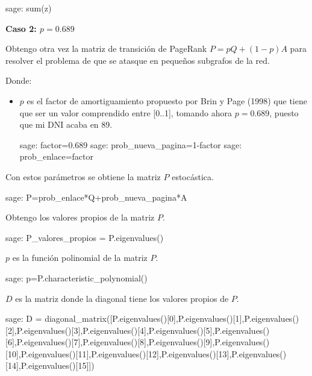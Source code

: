 \begin{sagecommandline}
    sage: sum(z)
\end{sagecommandline}


\par\textbf{Caso 2: $p = 0.689$}
\par Obtengo otra vez la matriz de transición de PageRank $P=pQ + (1-p)A$ para resolver el 
problema de que se atasque en pequeños subgrafos de la red.
\par Donde:
\begin{itemize}
    \item $p$ es el factor de amortiguamiento propuesto por Brin y Page (1998) que tiene que ser un valor 
    comprendido entre [0..1], tomando ahora $p = 0.689$, puesto que mi DNI acaba en 89.
    \begin{sagecommandline}
        sage: factor=0.689
        sage: prob_nueva_pagina=1-factor
        sage: prob_enlace=factor
    \end{sagecommandline}
\end{itemize}

\par Con estos parámetros se obtiene la matriz $P$ estocástica.
\begin{sagecommandline}
    sage: P=prob_enlace*Q+prob_nueva_pagina*A
\end{sagecommandline}

\par Obtengo los valores propios de la matriz $P$.
\begin{sagecommandline}
    sage: P_valores_propios = P.eigenvalues()
\end{sagecommandline}
\par $p$ es la función polinomial de la matriz $P$.
\begin{sagecommandline}
    sage: p=P.characteristic_polynomial()
\end{sagecommandline}
\par $D$ es la matriz donde la diagonal tiene los valores propios de $P$.
\begin{sagecommandline}
    sage: D = diagonal_matrix([P.eigenvalues()[0],P.eigenvalues()[1],P.eigenvalues()[2],P.eigenvalues()[3],P.eigenvalues()[4],P.eigenvalues()[5],P.eigenvalues()[6],P.eigenvalues()[7],P.eigenvalues()[8],P.eigenvalues()[9],P.eigenvalues()[10],P.eigenvalues()[11],P.eigenvalues()[12],P.eigenvalues()[13],P.eigenvalues()[14],P.eigenvalues()[15]])
\end{sagecommandline}

